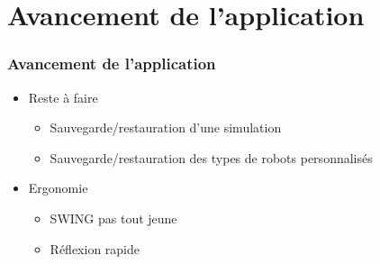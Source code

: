 \section{Avancement de l'application}
\begin{frame}
\frametitle{Avancement de l'application}
\begin{itemize}
	\item Reste à faire
	\begin{itemize}
		\item Sauvegarde/restauration d'une simulation
		\item Sauvegarde/restauration des types de robots personnalisés
	\end{itemize}
	\item Ergonomie
	\begin{itemize}
		\item SWING pas tout jeune
		\item Réflexion rapide
	\end{itemize}
\end{itemize}
\end{frame}

